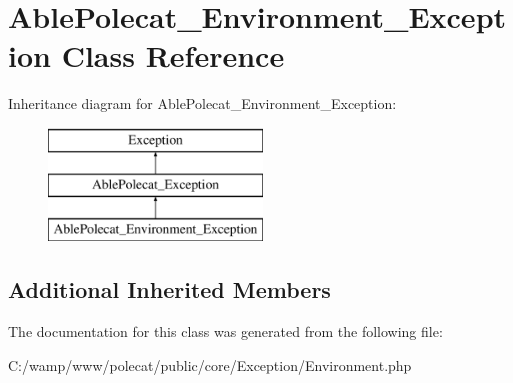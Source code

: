 \hypertarget{class_able_polecat___environment___exception}{}\section{Able\+Polecat\+\_\+\+Environment\+\_\+\+Exception Class Reference}
\label{class_able_polecat___environment___exception}
Inheritance diagram for Able\+Polecat\+\_\+\+Environment\+\_\+\+Exception\+:\begin{figure}[H]
\begin{center}
\leavevmode
\includegraphics[height=3.000000cm]{class_able_polecat___environment___exception}
\end{center}
\end{figure}
\subsection*{Additional Inherited Members}


The documentation for this class was generated from the following file\+:\begin{DoxyCompactItemize}
\item 
C\+:/wamp/www/polecat/public/core/\+Exception/Environment.\+php\end{DoxyCompactItemize}
